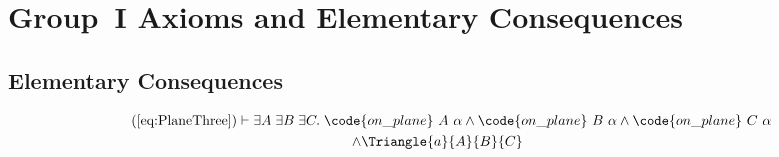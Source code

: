 \chapter{Group~I Axioms and Elementary Consequences}\label{app:group1}

\section{Elementary Consequences}
\begin{multline}
  \tag{\ref{eq:PlaneThree}}
  \vdash\exists A\;\exists B\;\exists C.\;\code{on\_plane}\ A\ \alpha\wedge\code{on\_plane}\ B\ \alpha\wedge\code{on\_plane}\ C\ \alpha\\
  \wedge \Triangle{a}{A}{B}{C}
\end{multline}

